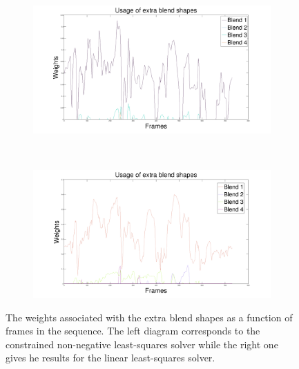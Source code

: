 \documentclass[11pt]{report}
\begin{document}
\begin{figure}[htbp!]
        \centering
        \begin{subfigure}[b]{0.47\textwidth}
                \includegraphics[trim = 10mm 0mm 10mm 0mm,clip,width=\textwidth]{img/weights/3D/Extrafaces/w2_72_usage.png}
        \end{subfigure}
        ~ %
        \begin{subfigure}[b]{0.47\textwidth}
                \includegraphics[trim = 10mm 0mm 10mm 0mm,clip,width=\textwidth]{img/weights/3D/Extrafaces/w3_72_usage.png}
        \end{subfigure}
        \caption{The weights associated with the extra blend shapes as a function of frames in the sequence. The left diagram corresponds to the constrained non-negative least-squares solver while the right one gives he results for the linear least-squares solver.}\label{fig:usage}
\end{figure}
\end{document}

